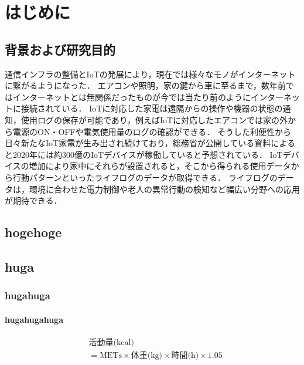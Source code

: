 \chapter{はじめに}
\thispagestyle{myheadings}

\section{背景および研究目的}

通信インフラの整備とIoTの発展により，現在では様々なモノがインターネットに繋がるようになった．
エアコンや照明，家の鍵から車に至るまで，数年前ではインターネットとは無関係だったものが今では当たり前のようにインターネットに接続されている．
IoTに対応した家電は遠隔からの操作や機器の状態の通知，使用ログの保存が可能であり，例えばIoTに対応したエアコンでは家の外から電源のON・OFFや電気使用量のログの確認ができる．
そうした利便性から日々新たなIoT家電が生み出され続けており，総務省が公開している資料\cite{soumusyo}によると2020年には約300億のIoTデバイスが稼働していると予想されている．
IoTデバイスの増加により家中にそれらが設置されると，そこから得られる使用データから行動パターンといったライフログのデータが取得できる．
ライフログのデータは，環境に合わせた電力制御や老人の異常行動の検知など幅広い分野への応用が期待できる．







\section{hogehoge}

\section{huga}
\subsection{hugahuga}
\subsubsection{hugahugahuga}


\begin{equation}
  \begin{split}
      &\mbox{活動量(kcal)} \\
      &= \mbox{METs} \times \mbox{体重(kg)} \times \mbox{時間(h)} \times 1.05 \label{CalFormula}
  \end{split}
\end{equation}

